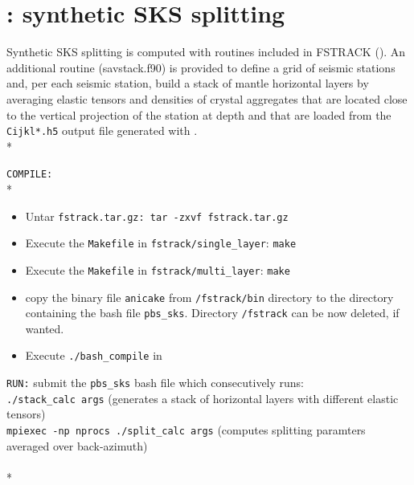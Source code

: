 \chapter{\skstitle: synthetic SKS splitting}
\label{chapter:sks}

Synthetic SKS splitting is computed with routines included in FSTRACK (\citet{becker2006epsl}). An additional routine (savstack.f90) is provided to define a grid of seismic stations and, per each seismic station, build a stack of mantle horizontal layers by averaging elastic tensors and densities of crystal aggregates that are located close to the vertical projection of the station at depth and that are loaded from the \texttt{Cijkl*.h5} output file generated with \drexmtitle{} .\\*
\vspace{0.5cm}

\texttt{COMPILE:}\\*

\begin{itemize}
    \item Untar \texttt{fstrack.tar.gz: tar -zxvf fstrack.tar.gz}
    \item Execute the \texttt{Makefile} in \texttt{fstrack/single\_layer}\footnotemark:   \texttt{make}
    \item Execute the \texttt{Makefile} in \texttt{fstrack/multi\_layer}:   \texttt{make}
    \item copy the binary file \texttt{anicake} from \texttt{/fstrack/bin} directory to the \skstitle{} directory containing the bash file \texttt{pbs\_sks}. Directory \texttt{/fstrack} can be now deleted, if wanted.
    \item Execute \texttt{./bash\_compile} in \skstitle{}
\end{itemize}


\vspace{0.5cm}

\texttt{RUN:} submit the \texttt{pbs\_sks} bash file which consecutively runs:\\
\texttt{./stack\_calc args} (generates a stack of horizontal layers with different elastic tensors)\\
\texttt{mpiexec  -np nprocs  ./split\_calc args} (computes splitting paramters averaged over back-azimuth)\\
\\*

